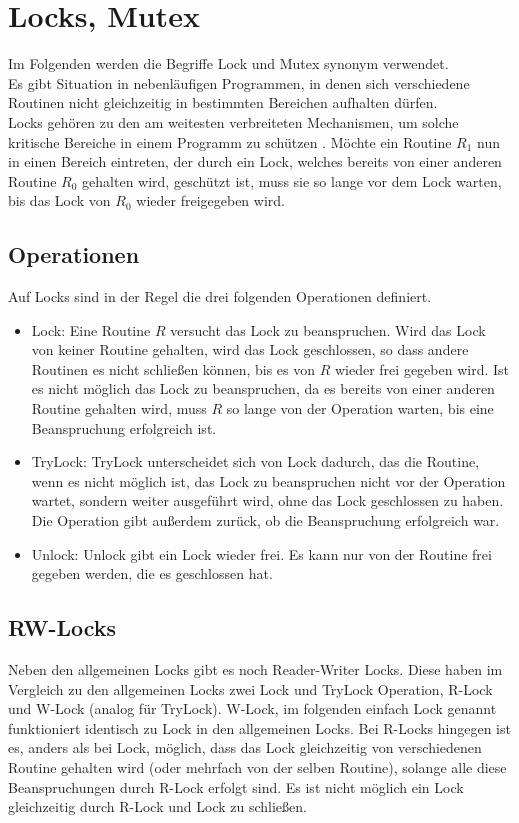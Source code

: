 \section{Locks, Mutex}
Im Folgenden werden die Begriffe Lock und Mutex synonym verwendet.\\
Es gibt Situation in nebenläufigen Programmen, in denen sich verschiedene 
Routinen nicht gleichzeitig in bestimmten Bereichen aufhalten dürfen.\\
Locks gehören zu den am weitesten verbreiteten Mechanismen, um solche kritische 
Bereiche in einem Programm zu schützen \cite{zhou}.
Möchte ein Routine $R_1$ nun in einen Bereich 
eintreten, der durch ein Lock, welches bereits von einer anderen Routine $R_0$ 
gehalten wird, geschützt ist, muss sie so lange vor dem Lock warten, bis das Lock 
von $R_0$ wieder freigegeben wird.
\subsection{Operationen}
Auf Locks sind in der Regel die drei folgenden Operationen definiert.
\begin{itemize}
    \item Lock: Eine Routine $R$ versucht das Lock zu beanspruchen. Wird das Lock 
        von keiner Routine gehalten, wird das Lock geschlossen, so dass andere 
        Routinen es nicht schließen können, bis es von $R$ wieder frei gegeben 
        wird. Ist es nicht möglich das Lock zu beanspruchen, da es bereits von 
        einer anderen Routine gehalten wird, muss $R$ so lange von der Operation 
        warten, bis eine Beanspruchung erfolgreich ist.
    \item TryLock: TryLock unterscheidet sich von Lock dadurch, das die Routine,
        wenn es nicht möglich ist, das Lock zu beanspruchen nicht vor der 
        Operation wartet, sondern weiter ausgeführt wird, ohne das Lock geschlossen
        zu haben. Die Operation gibt außerdem zurück, ob die Beanspruchung 
        erfolgreich war.
    \item Unlock: Unlock gibt ein Lock wieder frei. Es kann nur von der Routine 
        frei gegeben werden, die es geschlossen hat.
\end{itemize}
\subsection{RW-Locks}
Neben den allgemeinen Locks gibt es noch Reader-Writer Locks. Diese haben im 
Vergleich zu den allgemeinen Locks zwei Lock und TryLock Operation, R-Lock und 
W-Lock (analog für TryLock). W-Lock, im folgenden einfach Lock genannt funktioniert 
identisch zu Lock in den allgemeinen Locks. Bei R-Locks hingegen ist es, anders 
als bei Lock, möglich, dass das Lock gleichzeitig von verschiedenen Routine gehalten wird
(oder mehrfach von der selben Routine), solange alle diese Beanspruchungen durch 
R-Lock erfolgt sind. Es ist nicht möglich ein Lock gleichzeitig durch R-Lock und 
Lock zu schließen.

